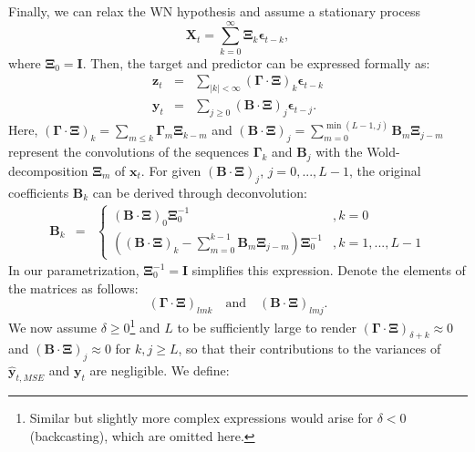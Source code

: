 \documentclass[11pt,a4paper]{article}
\begin{document}
Finally, we can relax the WN hypothesis and assume a stationary process 
\begin{equation}\label{x_m_st}
\mathbf{X}_t = \sum_{k=0}^\infty \boldsymbol{\Xi}_k \boldsymbol{\epsilon}_{t-k},
\end{equation}
where $\boldsymbol{\Xi}_0 = \mathbf{I}$. Then, the target and predictor can be expressed formally as:
\begin{eqnarray*}
\mathbf{z}_t&=&\sum_{|k|<\infty}(\boldsymbol{\Gamma}\cdot\boldsymbol{\Xi})_k \boldsymbol{\epsilon}_{t-k}\\
\mathbf{y}_t&=&\sum_{j\geq 0} (\mathbf{B}\cdot\boldsymbol{\Xi})_j\boldsymbol{\epsilon}_{t-j}.
\end{eqnarray*} 
Here, $(\boldsymbol{\Gamma}\cdot\boldsymbol{\Xi})_k =\sum_{m\leq k}\boldsymbol{\Gamma}_m\boldsymbol{\Xi}_{k-m}$ and $(\mathbf{B}\cdot\boldsymbol{\Xi})_j=\sum_{m=0}^{\min(L-1,j)}\mathbf{B}_m \boldsymbol{\Xi}_{j-m} $ represent the convolutions of the sequences $\boldsymbol{\Gamma}_k$ and $\mathbf{B}_j$ with the Wold-decomposition $\boldsymbol{\Xi}_m$ of $\mathbf{x}_t$. For  given $(\mathbf{B}\cdot\boldsymbol{\Xi})_j$, $j=0,...,L-1$, the original coefficients $\mathbf{B}_{k}$ can be derived through deconvolution:
\begin{eqnarray}\label{con_inv}
\mathbf{B}_{k}&=&\left\{\begin{array}{cc}(\mathbf{B}\cdot\boldsymbol{\Xi})_{0}\boldsymbol{\Xi}_0^{-1}&,k=0\\
\left(  (\mathbf{B}\cdot\boldsymbol{\Xi})_{k}-\sum_{m=0}^{k-1}\mathbf{B}_m \boldsymbol{\Xi}_{j-m}\right)\boldsymbol{\Xi}_0^{-1}&,k=1,...,L-1
\end{array}\right.
\end{eqnarray}
In our parametrization, $\boldsymbol{\Xi}_0^{-1} = \mathbf{I}$ simplifies this expression. Denote the elements of the matrices as follows:
\[
(\boldsymbol{\Gamma}\cdot\boldsymbol{\Xi})_{lmk}
 \quad \text{and} \quad (\mathbf{B}\cdot\boldsymbol{\Xi})_{lmj}.
 \] 
We now assume $\delta\geq 0$\footnote{Similar but slightly more complex expressions would arise for $\delta < 0$ (backcasting), which are omitted here.} and $L$ to be sufficiently large to render $(\boldsymbol{\Gamma} \cdot \boldsymbol{\Xi})_{\delta+k} \approx 0$ and $(\mathbf{B} \cdot \boldsymbol{\Xi})_j \approx 0$ for $k,j \geq L$, so that  their contributions to the variances of $\hat{\mathbf{y}}_{t,MSE}$ and $\mathbf{y}_t$ are negligible. We define:
\end{document}
